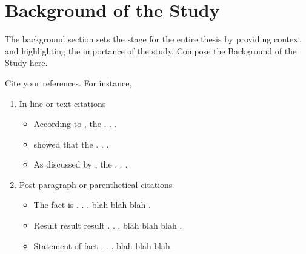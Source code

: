 \section{Background of the Study}

The background section sets the stage for the entire thesis by providing context and highlighting the importance of the study. Compose the Background of the Study here.

Cite your references. For instance,
\begin{enumerate}
	\item In-line or text citations
	\begin{itemize}
		\item According to \textcite{BooktagYear}, the . . .
		\item \textcite{JournaltagYear} showed that the . . .
		\item As discussed by \textcite{InbookTagYear}, the . . .
	\end{itemize}
	
	\item Post-paragraph or parenthetical citations
	\begin{itemize}
		\item The fact is . . . blah blah blah \parencite{WebsiteTag}.
		\item Result result result . . . blah blah blah \parencite{ProceedingsTag}.
		\item Statement of fact . . . blah blah blah \parencite{ThesisTag}
	\end{itemize}
\end{enumerate}
